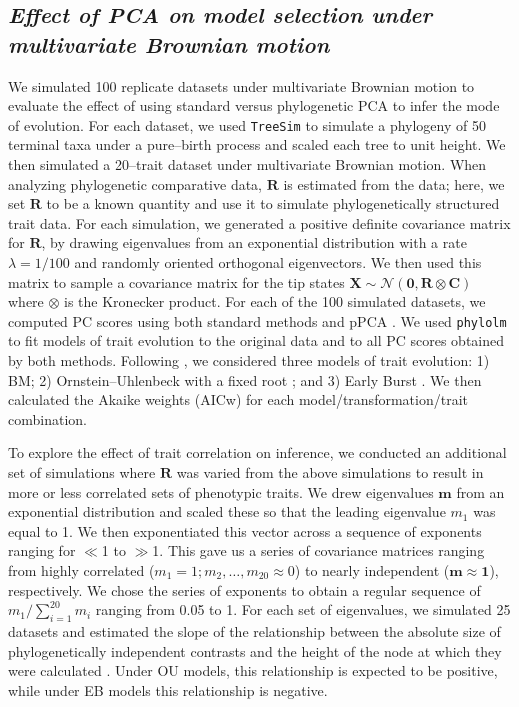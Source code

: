 \documentclass[a4paper,11pt]{article}
\begin{document}
\subsection{\emph{Effect of PCA on model selection under multivariate Brownian motion}}
We simulated 100 replicate datasets under multivariate Brownian motion to evaluate the effect of using standard versus phylogenetic PCA to infer the mode of evolution. For each dataset, we used \texttt{TreeSim} \citep{treesim} to simulate a phylogeny of 50 terminal taxa under a pure--birth process and scaled each tree to unit height. We then simulated a 20--trait dataset under multivariate Brownian motion. When analyzing phylogenetic comparative data, $\mathbf{R}$ is estimated from the data; here, we set $\mathbf{R}$ to be a known quantity and use it to simulate phylogenetically structured trait data. For each simulation, we generated a positive definite covariance matrix for $\mathbf{R}$, by drawing eigenvalues from an exponential distribution with a rate $\lambda = \text{1/100}$ and randomly oriented orthogonal eigenvectors. We then used this matrix to sample a covariance matrix for the tip states 
$\mathbf{X}\sim \mathcal{N}(\mathbf{0}, \mathbf{R} \otimes \mathbf{C})$ where $\otimes$ is the Kronecker product.
For each of the 100 simulated datasets, we computed PC scores using both standard methods and pPCA \citep[using the \texttt{phytools} package;][]{phytools}. We used \texttt{phylolm} \citep{HoandAne2014} to fit models of trait evolution to the original data and to all PC scores obtained by both methods. Following \citet{Harmon2010}, we considered three models of trait evolution: 1) BM; 2) Ornstein--Uhlenbeck with a fixed root \citep[OU:][]{ Hansen1997}; and 3) Early Burst \citep[EB:][]{Blomberg2003, Harmon2010}. We then calculated the Akaike weights (AICw) for each model/transformation/trait combination.

To explore the effect of trait correlation on inference, we conducted an additional set of simulations where $\mathbf{R}$ was varied from the above simulations to result in more or less correlated sets of phenotypic traits. We drew eigenvalues $\mathbf{m}$ from an exponential distribution and scaled these so that the leading eigenvalue $m_{\text{1}}$ was equal to 1. We then exponentiated this vector across a sequence of exponents ranging for $\ll$1 to $\gg$1. This gave us a series of covariance matrices ranging from highly correlated ($m_{\text{1}} = \text{1}; m_{\text{2}}, \ldots, m_{\text{20}} \approx \text{0}$) to nearly independent ($\mathbf{m} \approx \textbf{1}$), respectively. We chose the series of exponents to obtain a regular sequence of $m_{\text{1}} / \sum_{i=\text{1}}^{\text{20}} m_i$ ranging from 0.05 to 1. For each set of eigenvalues, we simulated 25 datasets and estimated the slope of the relationship between the absolute size of phylogenetically independent contrasts \citep{Felsenstein1985} and the height of the node at which they were calculated \citep[i.e., the ``node height test'' of][]{FreckletonHarvey2006}. Under OU models, this relationship is expected to be positive, while under EB models this relationship is negative.
\end{document}

